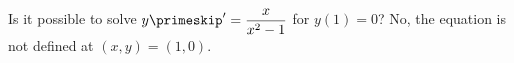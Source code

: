 {Is it possible to solve $y\primeskip' = \dfrac{x}{x^2-1}$ for $y(1) = 0$?}
{No, the equation is not defined at $(x,y) = (1,0)$.}